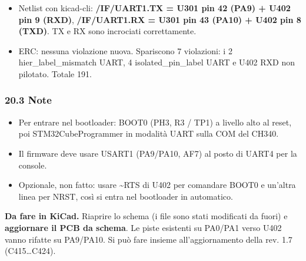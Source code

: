 \begin{itemize}
\item Netlist con kicad-cli: \textbf{/\allowbreak{}IF/\allowbreak{}UART1.TX = U301 pin 42 (PA9) + U402 pin 9 (RXD)}, \textbf{/\allowbreak{}IF/\allowbreak{}UART1.RX = U301 pin 43 (PA10) + U402 pin 8 (TXD)}. TX e RX sono incrociati correttamente.
\item ERC: nessuna violazione nuova. Spariscono 7 violazioni: i 2 hier\_\allowbreak{}label\_\allowbreak{}mismatch UART, 4 isolated\_\allowbreak{}pin\_\allowbreak{}label UART e U402 RXD non pilotato. Totale 191.
\end{itemize}

\subsubsection[20.3 Note]{20.3 Note}

\begin{itemize}
\item Per entrare nel bootloader: BOOT0 (PH3, R3 /\allowbreak{} TP1) a livello alto al reset, poi STM32CubeProgrammer in modalità UART sulla COM del CH340.
\item Il firmware deve usare USART1 (PA9/\allowbreak{}PA10, AF7) al posto di UART4 per la console.
\item Opzionale, non fatto: usare \textasciitilde{}RTS di U402 per comandare BOOT0 e un'altra linea per NRST, così si entra nel bootloader in automatico.
\end{itemize}

\begin{notebox}
\textbf{Da fare in KiCad.} Riaprire lo schema (i file sono stati modificati da fuori) e \textbf{aggiornare il PCB da schema}. Le piste esistenti su PA0/\allowbreak{}PA1 verso U402 vanno rifatte su PA9/\allowbreak{}PA10. Si può fare insieme all'aggiornamento della rev. 1.7 (C415…C424).
\end{notebox}
